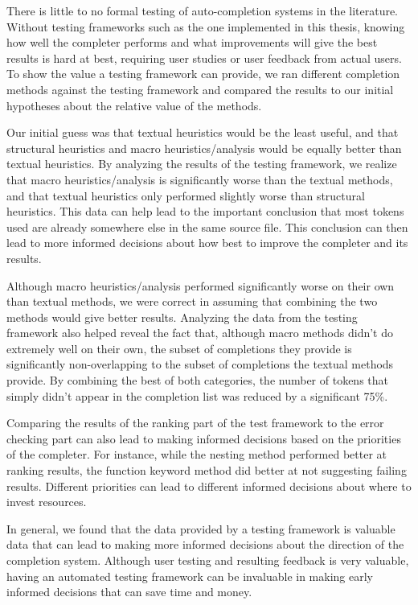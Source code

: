\documentclass[ms,electronic,twosidetoc,letterpaper,chaptercenter,parttop,lol,lof,lot]{byumsphd}
\begin{document}
There is little to no formal testing of auto-completion systems in the literature.
Without testing frameworks such as the one implemented in this thesis, knowing how well the completer performs and what improvements will give the best results is hard at best, requiring user studies or user feedback from actual users.
To show the value a testing framework can provide, we ran different completion methods against the testing framework and compared the results to our initial hypotheses about the relative value of the methods.

Our initial guess was that textual heuristics would be the least useful, and that structural heuristics and macro heuristics/analysis would be equally better than textual heuristics.
By analyzing the results of the testing framework, we realize that macro heuristics/analysis is significantly worse than the textual methods, and that textual heuristics only performed slightly worse than structural heuristics.
This data can help lead to the important conclusion that most tokens used are already somewhere else in the same source file.
This conclusion can then lead to more informed decisions about how best to improve the completer and its results.

Although macro heuristics/analysis performed significantly worse on their own than textual methods, we were correct in assuming that combining the two methods would give better results.
Analyzing the data from the testing framework also helped reveal the fact that, although macro methods didn't do extremely well on their own, the subset of completions they provide is significantly non-overlapping to the subset of completions the textual methods provide.
By combining the best of both categories, the number of tokens that simply didn't appear in the completion list was reduced by a significant 75\%.

Comparing the results of the ranking part of the test framework to the error checking part can also lead to making informed decisions based on the priorities of the completer.
For instance, while the nesting method performed better at ranking results, the function keyword method did better at not suggesting failing results.
Different priorities can lead to different informed decisions about where to invest resources.

In general, we found that the data provided by a testing framework is valuable data that can lead to making more informed decisions about the direction of the completion system.
Although user testing and resulting feedback is very valuable, having an automated testing framework can be invaluable in making early informed decisions that can save time and money.
\end{document}
